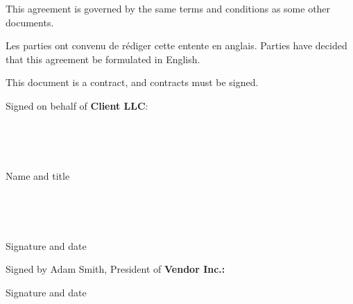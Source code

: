 This agreement is governed by the same terms and conditions as some other documents.


Les parties ont convenu de rédiger cette entente en anglais. Parties have decided that this agreement be formulated in English.

\pagebreak


This document is a contract, and contracts must be signed.

Signed on behalf of \textbf{Client LLC}:

~

~

\hrulefill

Name and title

~

~

\hrulefill

Signature and date

Signed by Adam Smith, President of \textbf{Vendor Inc.:}

\hrulefill

Signature and date
